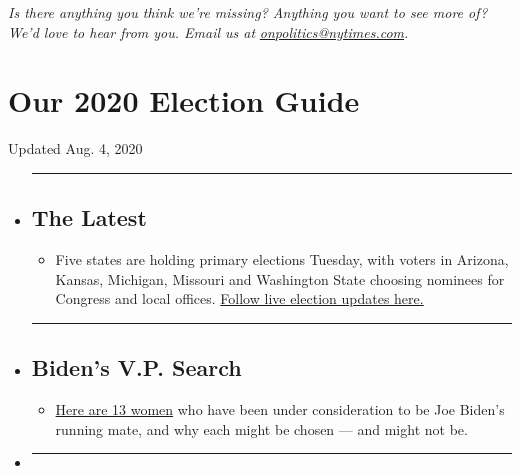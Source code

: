 \emph{Is there anything you think we're missing? Anything you want to
see more of? We'd love to hear from you. Email us at}
\href{mailto:onpolitics@nytimes.com}{\emph{onpolitics@nytimes.com}}\emph{.}

\hypertarget{our-2020-election-guide}{%
\section{Our 2020 Election Guide}\label{our-2020-election-guide}}

Updated Aug. 4, 2020

\begin{itemize}
\item
  \begin{center}\rule{0.5\linewidth}{\linethickness}\end{center}

  \hypertarget{the-latest}{%
  \subsection{The Latest}\label{the-latest}}

  \begin{itemize}
  \tightlist
  \item
    Five states are holding primary elections Tuesday, with voters in
    Arizona, Kansas, Michigan, Missouri and Washington State choosing
    nominees for Congress and local offices.
    \href{https://www.nytimes.com/2020/08/04/us/elections/primary-election-michigan-arizona-kansas.html?action=click\&pgtype=Article\&state=default\&region=BELOW_MAIN_CONTENT\&context=storylines_guide}{Follow
    live election updates here.}
  \end{itemize}
\item
  \begin{center}\rule{0.5\linewidth}{\linethickness}\end{center}

  \hypertarget{bidens-vp-search}{%
  \subsection{Biden's V.P. Search}\label{bidens-vp-search}}

  \begin{itemize}
  \tightlist
  \item
    \href{https://www.nytimes.com/article/biden-vice-president-2020.html?action=click\&pgtype=Article\&state=default\&region=BELOW_MAIN_CONTENT\&context=storylines_guide}{Here
    are 13 women} who have been under consideration to be Joe Biden's
    running mate, and why each might be chosen --- and might not be.
  \end{itemize}
\item
  \begin{center}\rule{0.5\linewidth}{\linethickness}\end{center}


\end{itemize}
